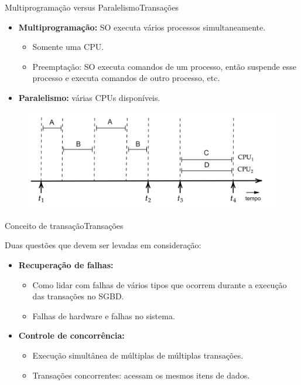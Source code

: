 \documentclass[t]{beamer}
\begin{document}

\begin{ftst}{Multiprogramação versus Paralelismo}{Transações}

\begin{itemize}
    \item \textbf{Multiprogramação:} SO executa vários processos simultaneamente.
    \begin{itemize}
        \item Somente uma CPU.
        \item Preemptação: SO executa comandos de um processo, então suspende esse processo e executa comandos de outro processo, etc.
    \end{itemize}
    \item \textbf{Paralelismo:} várias CPUs disponíveis.
\end{itemize}

\begin{figure}
    \centering
    \includegraphics[scale=0.13]{Figuras_transacoes/1.png}
\end{figure}
\end{ftst}


\begin{ftst}{Conceito de transação}{Transações}

Duas questões que devem ser levadas em consideração:
\vone
\begin{itemize}
    \item \textbf{Recuperação de falhas:} 
    \begin{itemize}
        \item Como lidar com falhas de vários tipos que ocorrem durante a execução das transações no SGBD.
        \item Falhas de hardware e falhas no sistema.
    \end{itemize}
    \item \textbf{Controle de concorrência:} 
    \begin{itemize}
        \item Execução simultânea de múltiplas de múltiplas transações.
        \item Transações concorrentes: acessam os mesmos itens de dados.
    \end{itemize}
\end{itemize}
\end{ftst}
\end{document}
